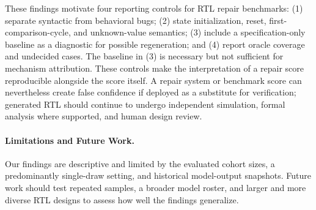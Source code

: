 \documentclass{article}
\begin{document}
These findings motivate four reporting controls for RTL repair benchmarks: (1) separate syntactic
from behavioral bugs; (2) state initialization, reset, first-comparison-cycle, and unknown-value
semantics; (3) include a specification-only baseline as a diagnostic for possible regeneration;
and (4) report oracle coverage and undecided cases. The baseline in (3) is necessary but not sufficient
for mechanism attribution. These controls make the interpretation of a
repair score reproducible alongside the score itself. A repair system or benchmark score can
nevertheless create false confidence if deployed as a substitute for verification; generated RTL
should continue to undergo independent simulation, formal analysis where supported, and human
design review.

\paragraph{Limitations and Future Work.}
Our findings are descriptive and limited by the evaluated cohort sizes, a predominantly single-draw
setting, and historical model-output snapshots. Future work should test repeated samples, a broader
model roster, and larger and more diverse RTL designs to assess how well the findings generalize.
\end{document}
